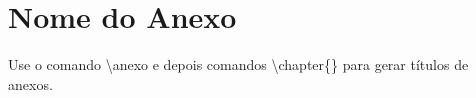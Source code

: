 \documentclass[openright]{normas-utf-tex} %
\begin{document}





\apendice



\anexo
\chapter{Nome do Anexo}

Use o comando {\ttfamily \textbackslash anexo} e depois comandos {\ttfamily \textbackslash chapter\{\}}
para gerar t\'itulos de anexos.








% 
%
\end{document}
